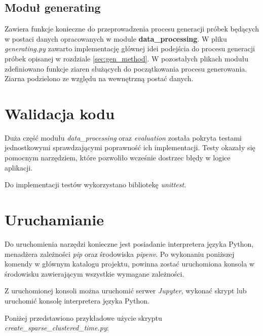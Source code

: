 {{        \subsection{Moduł generating}
        {
            Zawiera funkcje konieczne do przeprowadzenia procesu generacji próbek będących w postaci danych opracowanych w module {\textbf {data\_processing}}. W pliku {\textit {generating.py}} zawarto implementację głównej idei podejścia do procesu generacji próbek opisanej w rozdziale \ref{sec:gen_method}. W pozostałych plikach modułu zdefiniowano funkcje ziaren służących do początkowania procesu generowania. Ziarna podzielono ze względu na wewnętrzną postać danych.
        }

    }

    \section{Walidacja kodu}
    {
        Duża część modułu {\textit {data\_processing}} oraz {\textit {evaluation}} została pokryta testami jednostkowymi sprawdzającymi poprawność ich implementacji. 
        Testy okazały się pomocnym narzędziem, które pozwoliło wcześnie dostrzec błędy w logice aplikacji.

        Do implementacji testów wykorzystano bibliotekę {\textit {unittest}}.
    }

    \pagebreak

    \section{Uruchamianie}
    {
        Do uruchomienia narzędzi konieczne jest posiadanie interpretera języka Python, menadżera zależności {\textit {pip}} oraz środowiska {\textit {pipenv}}. Po wykonaniu poniższej komendy w głównym katalogu projektu, powinna zostać uruchomiona konsola w środowisku zawierającym wszystkie wymagane zależności.

        

        Z uruchomionej konsoli można uruchomić serwer {\textit {Jupyter}}, wykonać skrypt lub uruchomić konsolę interpretera języka Python.


        Poniżej przedstawiono przykładowe użycie skryptu \\{\textit {create\_sparse\_clustered\_time.py}}:
        
    }
}